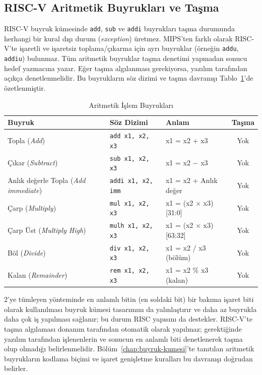 \subsection{RISC-V Aritmetik Buyrukları ve Taşma}

RISC-V buyruk kümesinde \texttt{add}, \texttt{sub} ve \texttt{addi} buyrukları taşma durumunda herhangi bir kural dışı durum (\emph{exception}) üretmez. MIPS'ten farklı olarak RISC-V'te işaretli ve işaretsiz toplama/çıkarma için ayrı buyruklar (örneğin \texttt{addu}, \texttt{addiu}) bulunmaz. Tüm aritmetik buyruklar taşma denetimi yapmadan sonucu hedef yazmacına yazar. Eğer taşma algılanması gerekiyorsa, yazılım tarafından açıkça denetlenmelidir. Bu buyrukların söz dizimi ve taşma davranışı Tablo~\ref{tab:ari-aritmetik-buyruklar}'de özetlenmiştir.

\begin{table}[htbp]
\centering
\caption{Aritmetik İşlem Buyrukları}
\label{tab:ari-aritmetik-buyruklar}
\small
\begin{tabularx}{\textwidth}{l l X c}
\toprule
\textbf{Buyruk} & \textbf{Söz Dizimi} & \textbf{Anlam} & \textbf{Taşma} \\
\midrule
Topla (\emph{Add}) & \texttt{add x1, x2, x3} & x1 = x2 + x3 & Yok \\
Çıkar (\emph{Subtract}) & \texttt{sub x1, x2, x3} & x1 = x2 $-$ x3 & Yok \\
Anlık değerle Topla (\emph{Add immediate}) & \texttt{addi x1, x2, imm} & x1 = x2 + Anlık değer & Yok \\
Çarp (\emph{Multiply}) & \texttt{mul x1, x2, x3} & x1 = (x2 $\times$ x3)[31:0] & Yok \\
Çarp Üst (\emph{Multiply High}) & \texttt{mulh x1, x2, x3} & x1 = (x2 $\times$ x3)[63:32] & Yok \\
Böl (\emph{Divide}) & \texttt{div x1, x2, x3} & x1 = x2 / x3 (bölüm) & Yok \\
Kalan (\emph{Remainder}) & \texttt{rem x1, x2, x3} & x1 = x2 \% x3 (kalan) & Yok \\
\bottomrule
\end{tabularx}
\end{table}

2'ye tümleyen yönteminde en anlamlı bitin (en soldaki bit) bir bakıma işaret biti olarak kullanılması buyruk kümesi tasarımını da yalınlaştırır ve daha az buyrukla daha çok iş yapılması sağlanır; bu durum RISC yapısını da destekler. RISC-V'te taşma algılaması donanım tarafından otomatik olarak yapılmaz; gerektiğinde yazılım tarafından işlenenlerin ve sonucun en anlamlı biti denetlenerek taşma olup olmadığı belirlenmelidir. Bölüm~\ref{chap:buyruk-kumesi}'te tanıtılan aritmetik buyrukların kodlama biçimi ve işaret genişletme kuralları bu davranışı doğrudan belirler.


